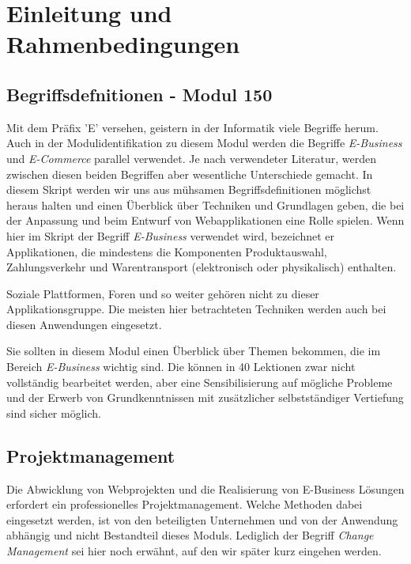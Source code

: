 \section{Einleitung und Rahmenbedingungen}

\subsection{Begriffsdefnitionen - Modul 150}

Mit dem Präfix 'E' versehen, geistern in der Informatik viele Begriffe herum.
Auch in der Modulidentifikation zu diesem Modul werden die Begriffe \emph{E-Business}
und \emph{E-Commerce} parallel verwendet. Je nach verwendeter Literatur, werden
zwischen diesen beiden Begriffen aber wesentliche Unterschiede gemacht.
In diesem Skript werden wir uns aus mühsamen Begriffsdefinitionen möglichst
heraus halten und einen Überblick über Techniken und Grundlagen geben,
die bei der Anpassung und beim Entwurf von Webapplikationen eine Rolle
spielen. Wenn hier im Skript der Begriff \emph{E-Business} verwendet wird,
bezeichnet er Applikationen, die mindestens die Komponenten Produktauswahl,
Zahlungsverkehr und Warentransport (elektronisch oder physikalisch) enthalten.

Soziale Plattformen, Foren und so weiter gehören nicht zu dieser
Applikationsgruppe. Die meisten hier betrachteten Techniken werden
auch bei diesen Anwendungen eingesetzt.

Sie sollten in diesem Modul einen Überblick über Themen bekommen, die im
Bereich \emph{E-Business} wichtig sind. Die können in 40 Lektionen zwar nicht
vollständig bearbeitet werden, aber eine Sensibilisierung auf mögliche
Probleme und der Erwerb von Grundkenntnissen mit zusätzlicher selbstständiger
Vertiefung sind sicher möglich.

\subsection{Projektmanagement}

Die Abwicklung von Webprojekten und die Realisierung von E-Business Lösungen
erfordert ein professionelles Projektmanagement. Welche Methoden dabei
eingesetzt werden, ist von den beteiligten Unternehmen und von der Anwendung
abhängig und nicht Bestandteil dieses Moduls. Lediglich der Begriff \emph{Change
Management} sei hier noch erwähnt, auf den wir später kurz eingehen werden.


